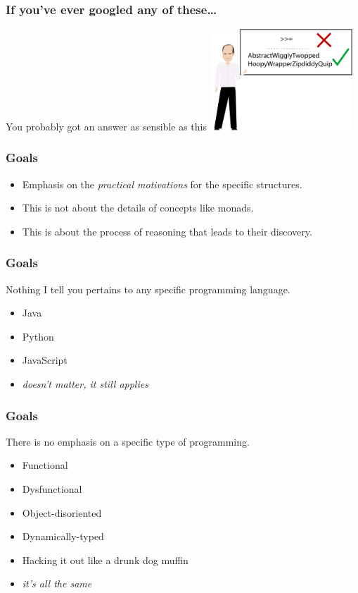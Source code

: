 \begin{frame}[fragile]
\frametitle{If you've ever googled any of these\ldots}
\begin{block}{You probably got an answer as sensible as this}
\includegraphics[height=3.8cm]{image/AbstractWigglyTwoppedHoopyWrapperZipdiddyQuip.png}
\end{block}
\end{frame}

\begin{frame}
\frametitle{Goals}
\begin{itemize}
\item<1-> Emphasis on the \emph{practical motivations} for the specific structures.
\item<2-> This is not about the details of concepts like monads.
\item<3-> This is about the process of reasoning that leads to their discovery.
\end{itemize}
\end{frame}

\begin{frame}
\frametitle{Goals}
\begin{block}{Nothing I tell you pertains to any specific programming language.}
\begin{itemize}
\item Java
\item Python
\item JavaScript
\item \emph{doesn't matter, it still applies}
\end{itemize}
\end{block}
\end{frame}

\begin{frame}
\frametitle{Goals}
\begin{block}{There is no emphasis on a specific type of programming.}
\begin{itemize}
\item Functional
\item Dysfunctional
\item Object-disoriented
\item Dynamically-typed
\item Hacking it out like a drunk dog muffin
\item \emph{it's all the same}
\end{itemize}
\end{block}
\end{frame}
